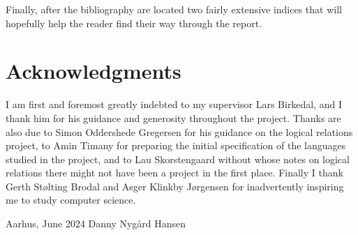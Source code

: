 Finally, after the bibliography are located two fairly extensive indices that will hopefully help the reader find their way through the report.


\section*{Acknowledgments}

I am first and foremost greatly indebted to my supervisor Lars Birkedal, and I thank him for his guidance and generosity throughout the project. Thanks are also due to Simon Oddershede Gregersen for his guidance on the logical relations project, to Amin Timany for preparing the initial specification of the languages studied in the project, and to Lau Skorstengaard without whose notes on logical relations there might not have been a project in the first place. Finally I thank Gerth Stølting Brodal and Asger Klinkby Jørgensen for inadvertently inspiring me to study computer science.

\enlargethispage{2\onelineskip}

\vspace{\baselineskip}

\noindent Aarhus, June 2024 \hfill Danny Nygård Hansen